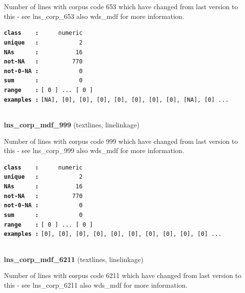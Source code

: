 \documentclass[]{article}
\begin{document}
Number of lines with corpus code 653 which have changed from last
version to this - see lns\_corp\_653 also wds\_mdf for more information.

\textbf{\texttt{class\ \ \ \ :}} \texttt{~~~~~numeric}\\
\textbf{\texttt{unique\ \ \ :}} \texttt{~~~~~~~~~~~2}\\
\textbf{\texttt{NAs\ \ \ \ \ \ :}} \texttt{~~~~~~~~~~16}\\
\textbf{\texttt{not-NA\ \ \ :}} \texttt{~~~~~~~~~770}\\
\textbf{\texttt{not-0-NA\ :}} \texttt{~~~~~~~~~~~0}\\
\textbf{\texttt{sum\ \ \ \ \ \ :}} \texttt{~~~~~~~~~~~0}\\
\textbf{\texttt{range\ \ \ \ :}}
\texttt{{[}\ 0\ {]}\ ...\ {[}\ 0\ {]}}\\
\textbf{\texttt{examples\ :}}
\texttt{{[}NA{]},\ {[}0{]},\ {[}0{]},\ {[}0{]},\ {[}0{]},\ {[}0{]},\ {[}0{]},\ {[}0{]},\ {[}NA{]},\ {[}0{]}\ ...}\\

~

\textbf{lns\_corp\_mdf\_999} (textlines, linelinkage)

Number of lines with corpus code 999 which have changed from last
version to this - see lns\_corp\_999 also wds\_mdf for more information.

\textbf{\texttt{class\ \ \ \ :}} \texttt{~~~~~numeric}\\
\textbf{\texttt{unique\ \ \ :}} \texttt{~~~~~~~~~~~2}\\
\textbf{\texttt{NAs\ \ \ \ \ \ :}} \texttt{~~~~~~~~~~16}\\
\textbf{\texttt{not-NA\ \ \ :}} \texttt{~~~~~~~~~770}\\
\textbf{\texttt{not-0-NA\ :}} \texttt{~~~~~~~~~~~0}\\
\textbf{\texttt{sum\ \ \ \ \ \ :}} \texttt{~~~~~~~~~~~0}\\
\textbf{\texttt{range\ \ \ \ :}}
\texttt{{[}\ 0\ {]}\ ...\ {[}\ 0\ {]}}\\
\textbf{\texttt{examples\ :}}
\texttt{{[}0{]},\ {[}0{]},\ {[}0{]},\ {[}0{]},\ {[}0{]},\ {[}0{]},\ {[}0{]},\ {[}0{]},\ {[}0{]},\ {[}0{]}\ ...}\\

~

\textbf{lns\_corp\_mdf\_6211} (textlines, linelinkage)

Number of lines with corpus code 6211 which have changed from last
version to this - see lns\_corp\_6211 also wds\_mdf for more
information.
\end{document}
